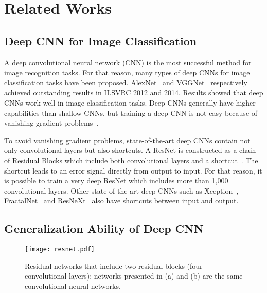 \documentclass[10pt,twocolumn,letterpaper]{article}
\begin{document}
\section{Related Works}
\label{sec:related}

\subsection{Deep CNN for Image Classification}
A deep convolutional neural network (CNN) is the most successful method for image recognition tasks.
For that reason, many types of deep CNNs for image classification tasks have been proposed.
AlexNet~\cite{AlexNet} and VGGNet~\cite{VGGNet} respectively achieved outstanding results in ILSVRC 2012 and 2014.
Results showed that deep CNNs work well in image classification tasks.
Deep CNNs generally have higher capabilities than shallow CNNs, but training a deep CNN is not easy because of vanishing gradient problems~\cite{VanishingGradient1,VanishingGradient2}.

To avoid vanishing gradient problems, state-of-the-art deep CNNs contain not only convolutional layers but also shortcuts.
A ResNet is constructed as a chain of Residual Blocks which include both convolutional layers and a shortcut~\cite{ResNet}.
The shortcut leads to an error signal directly from output to input.
For that reason, it is possible to train a very deep ResNet which includes more than 1,000 convolutional layers.
Other state-of-the-art deep CNNs such as Xception~\cite{Xception}, FractalNet~\cite{FractalNet} and ResNeXt~\cite{ResNeXt}
also have shortcuts between input and output.

\subsection{Generalization Ability of Deep CNN}

\begin{figure}
\centering
 \texttt{[image: resnet.pdf]}
 \caption{Residual networks that include two residual blocks (four convolutional layers): networks presented in (a) and (b) are the same convolutional neural networks.}
\label{fig:resnet}
\end{figure}
\end{document}
